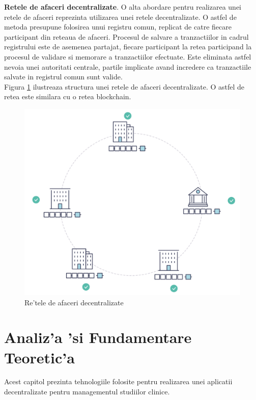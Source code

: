 \documentclass[12pt,a4paper,twoside]{report}
\begin{document}
\textbf{Retele de afaceri decentralizate}. O alta abordare pentru realizarea unei retele de afaceri reprezinta utilizarea unei retele decentralizate. O astfel de metoda presupune folosirea unui registru comun, replicat de catre fiecare participant din reteaua de afaceri. Procesul de salvare a tranzactiilor in cadrul registrului este de asemenea partajat, fiecare participant la retea participand la procesul de validare si memorare a tranzactiilor efectuate. Este eliminata astfel nevoia unei autoritati centrale, partile implicate avand incredere ca tranzactiile salvate in registrul comun sunt valide. \\
Figura \ref{fig:decentralised} ilustreaza structura unei retele de afaceri decentralizate. O astfel de retea este similara cu o retea blockchain.
		\begin{figure}[H]
		\begin{center}
			\includegraphics[scale=0.3]{img/future_net.png}
			\caption{Re'tele de afaceri decentralizate\cite{fabricdoc}}
  			\label{fig:decentralised}
  		\end{center}
  		\end{figure}
  		

\chapter{Analiz'a 'si Fundamentare Teoretic'a}
\label{ch:analysis}
Acest capitol prezinta tehnologiile folosite pentru realizarea unei aplicatii decentralizate pentru managementul studiilor clinice.
\end{document}
